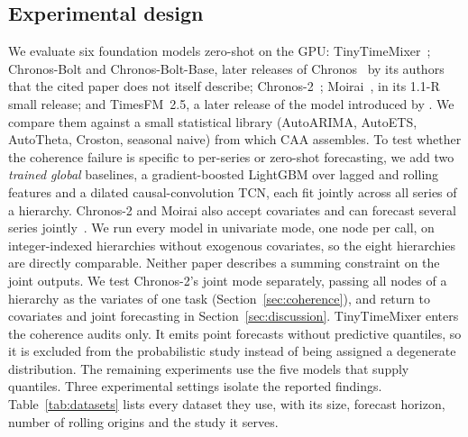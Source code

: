 \documentclass[review,number]{elsarticle}
\begin{document}
\subsection{Experimental design}
\label{sec:design}
We evaluate six foundation models zero-shot on the GPU: TinyTimeMixer~\citep{ttm2024};
Chronos-Bolt and Chronos-Bolt-Base, later releases of Chronos~\citep{chronos2024} by its
authors that the cited paper does not itself describe; Chronos-2~\citep{chronos2_2025};
Moirai~\citep{moirai2024}, in its 1.1-R small release; and TimesFM~2.5, a later release
of the model introduced by \citet{timesfm2024}. We compare them
against a small statistical library
(AutoARIMA, AutoETS, AutoTheta, Croston, seasonal naive) from which CAA assembles. To
test whether the coherence failure is specific to per-series or zero-shot forecasting, we
add two \emph{trained global} baselines, a gradient-boosted LightGBM over lagged and
rolling features and a dilated causal-convolution TCN, each fit jointly across all
series of a hierarchy. Chronos-2 and Moirai also accept covariates and can forecast
several series jointly~\citep{chronos2_2025,moirai2024}. We run every model in
univariate mode, one node per call, on integer-indexed hierarchies
without exogenous covariates, so the eight hierarchies are directly comparable. Neither
paper describes a summing constraint on the joint outputs. We test Chronos-2's joint
mode separately, passing all nodes of a hierarchy as the variates of one task
(Section~\ref{sec:coherence}), and
return to covariates and joint forecasting in Section~\ref{sec:discussion}.
TinyTimeMixer enters the coherence audits only. It emits point forecasts without
predictive quantiles, so it is excluded from the probabilistic study instead of being
assigned a degenerate distribution. The remaining experiments use the five models
that supply quantiles. Three experimental settings isolate the reported findings.
Table~\ref{tab:datasets} lists every dataset they use, with its size, forecast horizon,
number of rolling origins and the study it serves.


\end{document}
